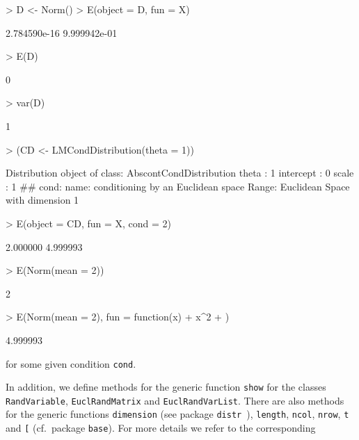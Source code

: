 \documentclass[11pt]{article}
\begin{document}
\begin{Schunk}
\begin{Sinput}
> D <- Norm()
> E(object = D, fun = X)
\end{Sinput}
\begin{Soutput}
[1] 2.784590e-16 9.999942e-01
\end{Soutput}
\begin{Sinput}
> E(D)
\end{Sinput}
\begin{Soutput}
[1] 0
\end{Soutput}
\begin{Sinput}
> var(D)
\end{Sinput}
\begin{Soutput}
[1] 1
\end{Soutput}
\begin{Sinput}
> (CD <- LMCondDistribution(theta = 1))
\end{Sinput}
\begin{Soutput}
Distribution object of class: AbscontCondDistribution
theta :  1 
intercept :  0 
scale :  1 
## cond:
name:	conditioning by an Euclidean space
Range:	Euclidean Space with dimension 1
\end{Soutput}
\begin{Sinput}
> E(object = CD, fun = X, cond = 2)
\end{Sinput}
\begin{Soutput}
[1] 2.000000 4.999993
\end{Soutput}
\begin{Sinput}
> E(Norm(mean = 2))
\end{Sinput}
\begin{Soutput}
[1] 2
\end{Soutput}
\begin{Sinput}
> E(Norm(mean = 2), fun = function(x) {
+     x^2
+ })
\end{Sinput}
\begin{Soutput}
[1] 4.999993
\end{Soutput}
\end{Schunk}
for some given condition {\tt cond}.
\par
In addition, we define methods for the generic function {\tt show} for the classes
{\tt RandVariable}, {\tt EuclRandMatrix} and {\tt EuclRandVarList}. There are 
also methods for the generic functions {\tt dimension} (see package 
{\tt distr}~\cite{distr}), {\tt length}, {\tt ncol}, {\tt nrow}, {\tt t} and 
{\tt [} (cf.\ package {\tt base}). For more details we refer to the corresponding 
\end{document}
